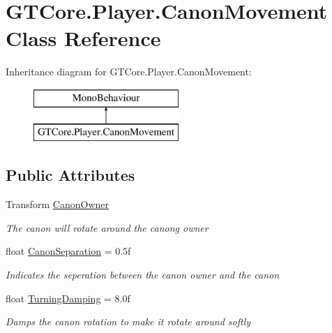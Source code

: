 \hypertarget{class_g_t_core_1_1_player_1_1_canon_movement}{}\section{G\+T\+Core.\+Player.\+Canon\+Movement Class Reference}
\label{class_g_t_core_1_1_player_1_1_canon_movement}
Inheritance diagram for G\+T\+Core.\+Player.\+Canon\+Movement\+:\begin{figure}[H]
\begin{center}
\leavevmode
\includegraphics[height=2.000000cm]{class_g_t_core_1_1_player_1_1_canon_movement}
\end{center}
\end{figure}
\subsection*{Public Attributes}
\begin{DoxyCompactItemize}
\item 
Transform \hyperlink{class_g_t_core_1_1_player_1_1_canon_movement_af53ac38464eb96b0892af73ca9e9ed51}{Canon\+Owner}
\begin{DoxyCompactList}\small\item\em The canon will rotate around the canong owner \end{DoxyCompactList}\item 
float \hyperlink{class_g_t_core_1_1_player_1_1_canon_movement_a0fa4b6b53690e2d4b4d4e50bf108114c}{Canon\+Separation} = 0.\+5f
\begin{DoxyCompactList}\small\item\em Indicates the seperation between the canon owner and the canon \end{DoxyCompactList}\item 
float \hyperlink{class_g_t_core_1_1_player_1_1_canon_movement_ad2b5f9544754bdc5104cbb98787dbedf}{Turning\+Damping} = 8.\+0f
\begin{DoxyCompactList}\small\item\em Damps the canon rotation to make it rotate around softly \end{DoxyCompactList}\end{DoxyCompactItemize}


